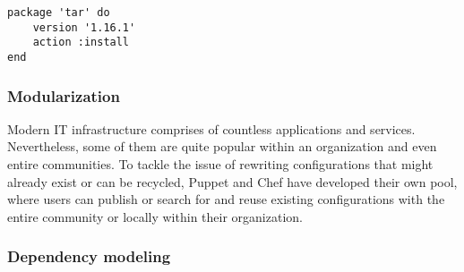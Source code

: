 \begin{verbatim}
package 'tar' do
	version '1.16.1'
	action :install
end
\end{verbatim}

\subsubsection{Modularization}

Modern IT infrastructure comprises of countless applications and services. Nevertheless, some of them are quite popular within an organization and even entire communities. To tackle the issue of rewriting configurations that might already exist or can be recycled, Puppet and Chef have developed their own pool, where users can publish or search for and reuse existing configurations with the entire community or locally within their organization.



\subsubsection{Dependency modeling}
